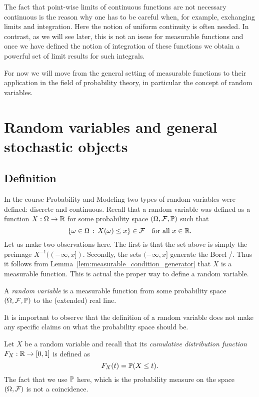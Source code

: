 The fact that point-wise limits of continuous functions are not necessary continuous is the reason why one has to be careful when, for example, exchanging limits and integration. Here the notion of uniform continuity is often needed. In contrast, as we will see later, this is not an issue for measurable functions and once we have defined the notion of integration of these functions we obtain a powerful set of limit results for such integrals.

For now we will move from the general setting of measurable functions to their application in the field of probability theory, in particular the concept of random variables.

\section{Random variables and general stochastic objects}\label{sec:random_variables}


\subsection{Definition}

In the course Probability and Modeling two types of random variables were defined: discrete and continuous. Recall that a random variable was defined as a function $X : \Omega \to \mathbb R$ for some probability space $(\Omega, \mathcal F, \mathbb P)$ such that
\[
	\{\omega \in \Omega \, : \, X(\omega) \le x\} \in \mathcal F \quad \text{for all } x \in \mathbb R.
\]
Let us make two observations here. The first is that the set above is simply the preimage $X^{-1}((-\infty,x])$. Secondly, the sets $(-\infty, x]$ generate the Borel \sigalg/. Thus it follows from Lemma~\ref{lem:measurable_condition_generator} that $X$ is a measurable function. This is actual the proper way to define a random variable.

\begin{definition}
A \emph{random variable} is a measurable function from some probability space $(\Omega,\mathcal F, \mathbb P)$ to the (extended) real line.
\end{definition}

It is important to observe that the definition of a random variable does not make any specific claims on what the probability space should be. 

Let $X$ be a random variable and recall that its \emph{cumulative distribution function} $F_X : \mathbb R \to [0,1]$ is defined as
\[
	F_X(t) = \mathbb P(X \le t).
\] 
The fact that we use $\mathbb P$ here, which is the probability measure on the space $(\Omega, \mathcal F)$ is not a coincidence.

